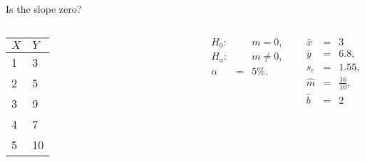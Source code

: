 \begin{frame}{Is the slope zero?}

  \begin{columns}

    \begin{tabular}{l|l}
      $X$ & $Y$ \\ \hline
      1 & 3 \\
      2 & 5  \\
      3 & 9 \\
      4 & 7  \\
      5 & 10
    \end{tabular}


    {\color{red}
      \begin{eqnarray*}
        H_0: & & m=0, \\
        H_a: & & m\neq 0, \\
        \alpha & = & 5\%.
      \end{eqnarray*}
      }

    
      \begin{eqnarray*}
        \bar{x} & = & 3 \\
        \bar{y} & = & 6.8, \\
        s_e & = & 1.55, \\
        \hat{m} & = & \frac{16}{10}, \\
        \hat{b} & = & 2
      \end{eqnarray*}


  \end{columns}



    
\end{frame}



